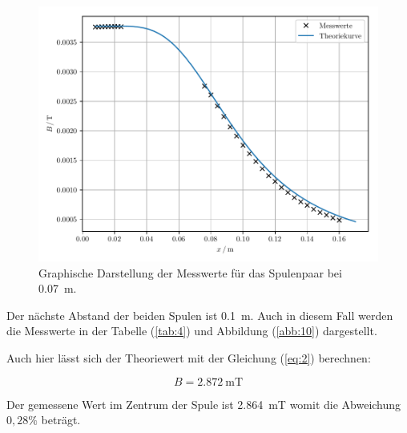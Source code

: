 \begin{figure}[H]
  \includegraphics{plot3.pdf}
  \caption{Graphische Darstellung der Messwerte für das Spulenpaar bei \SI{0.07}{\meter}.}
  \label{abb:9}
\end{figure}

Der nächste Abstand der beiden Spulen ist \SI{0.1}{\meter}. Auch in diesem Fall
werden die Messwerte in der Tabelle (\ref{tab:4}) und Abbildung (\ref{abb:10}) dargestellt.

Auch hier lässt sich der Theoriewert mit der Gleichung (\ref{eq:2}) berechnen:

\begin{equation*}
  B = \SI{2.872}{\milli\tesla}
\end{equation*}

Der gemessene Wert im Zentrum der Spule ist \SI{2.864}{\milli\tesla} womit die Abweichung
$ 0,28\% $ beträgt.

